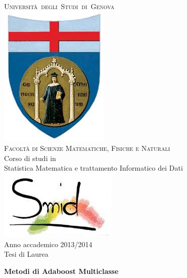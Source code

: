 




\thispagestyle{empty}
\enlargethispage{60mm}
\begin{titlepage}
\begin{center}
\textsc{ \LARGE{U}\LARGE{niversit\`a}\ \LARGE{degli}\
\LARGE{S}\LARGE{tudi}\ \LARGE{di}\
\LARGE{G}\LARGE{enova}\\
\vspace{0.3cm}
\includegraphics[scale=0.2]{unige.PNG}\\
\vspace{0.5cm}
{\LARGE Facolt\`a di Scienze Matematiche, Fisiche e Naturali}}\\
\vspace{5mm}
\Large Corso di studi in \\
\large Statistica Matematica e trattamento Informatico dei Dati\\
\vspace{0.5cm}
\includegraphics[scale=0.6]{smid.PNG}\\
\vspace{0.5cm}
\Large Anno accademico 2013/2014\\
\vspace{0.7cm}
{\LARGE Tesi di Laurea}\\
\vspace{0.70cm}
\begin{LARGE}
\textbf{Metodi di Adaboost Multiclasse}\\
\end{LARGE}
\vskip 1.2cm


\end{center}
\end{titlepage}
